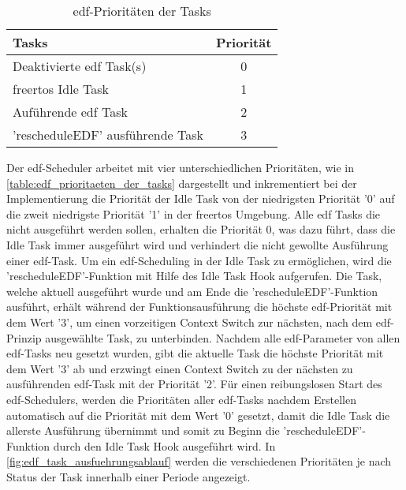 \documentclass[../EDF Master Thesis.tex]{subfiles}
\begin{document}
    \begin{table}[ht!]
        \centering
        \begin{tabular}{l|c}
            Tasks & Priorität \\
            \hline
            Deaktivierte \ac{edf} Task(s) & 0\\
            \ac{freertos} Idle Task & 1\\
            Auführende \ac{edf} Task & 2\\
            'rescheduleEDF' ausführende Task & 3
        \end{tabular}
        \caption{\ac{edf}-Prioritäten der Tasks}
        \label{table:edf_prioritaeten_der_tasks}
    \end{table}

    Der \ac{edf}-Scheduler arbeitet mit vier unterschiedlichen Prioritäten, wie in \autoref{table:edf_prioritaeten_der_tasks} dargestellt und inkrementiert bei der Implementierung die Priorität der Idle Task von der niedrigsten Priorität '0' auf die zweit niedrigste Priorität '1' in der \ac{freertos} Umgebung.
    Alle \ac{edf} Tasks die nicht ausgeführt werden sollen, erhalten die Priorität 0, was dazu führt, dass die Idle Task immer ausgeführt wird und verhindert die nicht gewollte Ausführung einer \ac{edf}-Task.
    Um ein \ac{edf}-Scheduling in der Idle Task zu ermöglichen, wird die 'rescheduleEDF'-Funktion mit Hilfe des Idle Task Hook aufgerufen.
    Die Task, welche aktuell ausgeführt wurde und am Ende die 'rescheduleEDF'-Funktion ausführt, erhält während der Funktionsausführung die höchste \ac{edf}-Priorität mit dem Wert '3', um einen vorzeitigen Context Switch zur nächsten, nach dem \ac{edf}-Prinzip ausgewählte Task, zu unterbinden.
    Nachdem alle \ac{edf}-Parameter von allen \ac{edf}-Tasks neu gesetzt wurden, gibt die aktuelle Task die höchste Priorität mit dem Wert '3' ab und erzwingt einen Context Switch zu der nächsten zu ausführenden \ac{edf}-Task mit der Priorität '2'.
    Für einen reibungslosen Start des \ac{edf}-Schedulers, werden die Prioritäten aller \ac{edf}-Tasks nachdem Erstellen automatisch auf die Priorität mit dem Wert '0' gesetzt, damit die Idle Task die allerste Ausführung übernimmt und somit zu Beginn die 'rescheduleEDF'-Funktion durch den Idle Task Hook ausgeführt wird.
    In \autoref{fig:edf_task_ausfuehrungsablauf} werden die verschiedenen Prioritäten je nach Status der Task innerhalb einer Periode angezeigt.
    
\end{document}
